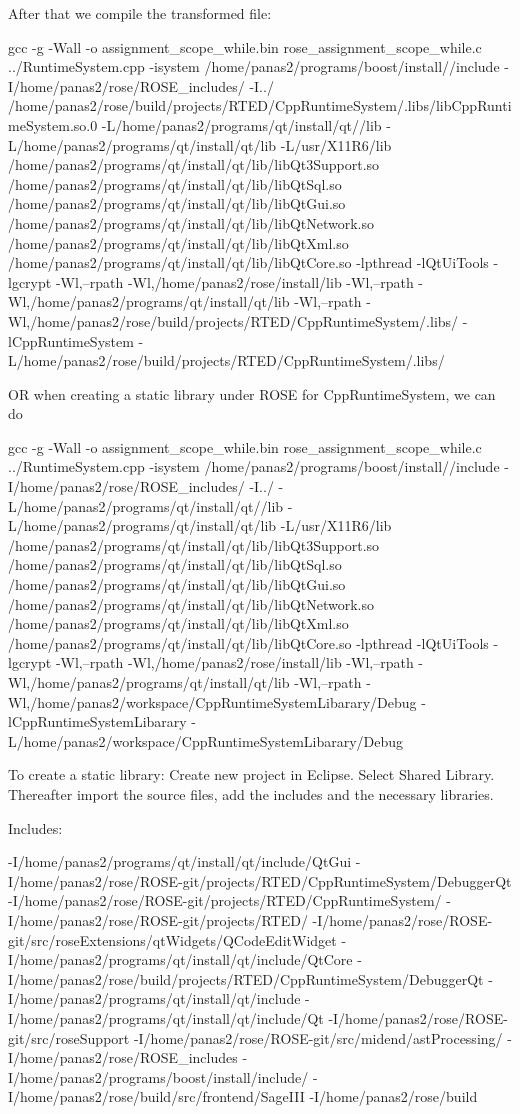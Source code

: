 After that we compile the transformed file:

  gcc -g -Wall -o assignment\_scope\_while.bin rose\_assignment\_scope\_while.c ../RuntimeSystem.cpp -isystem /home/panas2/programs/boost/install//include -I/home/panas2/rose/ROSE\_includes/ -I../ /home/panas2/rose/build/projects/RTED/CppRuntimeSystem/.libs/libCppRuntimeSystem.so.0 -L/home/panas2/programs/qt/install/qt//lib -L/home/panas2/programs/qt/install/qt/lib -L/usr/X11R6/lib /home/panas2/programs/qt/install/qt/lib/libQt3Support.so /home/panas2/programs/qt/install/qt/lib/libQtSql.so /home/panas2/programs/qt/install/qt/lib/libQtGui.so /home/panas2/programs/qt/install/qt/lib/libQtNetwork.so /home/panas2/programs/qt/install/qt/lib/libQtXml.so /home/panas2/programs/qt/install/qt/lib/libQtCore.so -lpthread -lQtUiTools -lgcrypt  -Wl,--rpath -Wl,/home/panas2/rose/install/lib -Wl,--rpath -Wl,/home/panas2/programs/qt/install/qt/lib -Wl,--rpath -Wl,/home/panas2/rose/build/projects/RTED/CppRuntimeSystem/.libs/ -lCppRuntimeSystem -L/home/panas2/rose/build/projects/RTED/CppRuntimeSystem/.libs/

OR when creating a static library under ROSE for CppRuntimeSystem, we can do

  gcc -g -Wall -o assignment\_scope\_while.bin rose\_assignment\_scope\_while.c ../RuntimeSystem.cpp -isystem /home/panas2/programs/boost/install//include -I/home/panas2/rose/ROSE\_includes/ -I../ -L/home/panas2/programs/qt/install/qt//lib -L/home/panas2/programs/qt/install/qt/lib -L/usr/X11R6/lib /home/panas2/programs/qt/install/qt/lib/libQt3Support.so /home/panas2/programs/qt/install/qt/lib/libQtSql.so /home/panas2/programs/qt/install/qt/lib/libQtGui.so /home/panas2/programs/qt/install/qt/lib/libQtNetwork.so /home/panas2/programs/qt/install/qt/lib/libQtXml.so /home/panas2/programs/qt/install/qt/lib/libQtCore.so -lpthread -lQtUiTools -lgcrypt  -Wl,--rpath -Wl,/home/panas2/rose/install/lib -Wl,--rpath -Wl,/home/panas2/programs/qt/install/qt/lib -Wl,--rpath -Wl,/home/panas2/workspace/CppRuntimeSystemLibarary/Debug -lCppRuntimeSystemLibarary -L/home/panas2/workspace/CppRuntimeSystemLibarary/Debug

To create a static library: Create new project in Eclipse. Select Shared Library. Thereafter import the source files, add the includes and the necessary libraries.

Includes:

  -I/home/panas2/programs/qt/install/qt/include/QtGui -I/home/panas2/rose/ROSE-git/projects/RTED/CppRuntimeSystem/DebuggerQt -I/home/panas2/rose/ROSE-git/projects/RTED/CppRuntimeSystem/ -I/home/panas2/rose/ROSE-git/projects/RTED/ -I/home/panas2/rose/ROSE-git/src/roseExtensions/qtWidgets/QCodeEditWidget -I/home/panas2/programs/qt/install/qt/include/QtCore -I/home/panas2/rose/build/projects/RTED/CppRuntimeSystem/DebuggerQt -I/home/panas2/programs/qt/install/qt/include -I/home/panas2/programs/qt/install/qt/include/Qt -I/home/panas2/rose/ROSE-git/src/roseSupport -I/home/panas2/rose/ROSE-git/src/midend/astProcessing/ -I/home/panas2/rose/ROSE\_includes -I/home/panas2/programs/boost/install/include/ -I/home/panas2/rose/build/src/frontend/SageIII -I/home/panas2/rose/build

